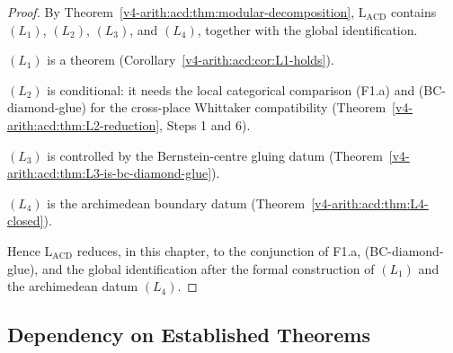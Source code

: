 \begin{proof}
By Theorem~\ref{v4-arith:acd:thm:modular-decomposition},
\(\mathrm{L}_{\mathrm{ACD}}\) contains
\((L_{1})\), \((L_{2})\), \((L_{3})\), and \((L_{4})\), together with
the global identification.

\((L_{1})\) is a theorem (Corollary~\ref{v4-arith:acd:cor:L1-holds}).

\((L_{2})\) is conditional: it needs the local categorical
comparison (F1.a) and (BC-diamond-glue) for the cross-place
Whittaker compatibility
(Theorem~\ref{v4-arith:acd:thm:L2-reduction}, Steps 1 and 6).

\((L_{3})\) is controlled by the Bernstein-centre gluing datum
(Theorem~\ref{v4-arith:acd:thm:L3-is-bc-diamond-glue}).

\((L_{4})\) is the archimedean boundary datum
(Theorem~\ref{v4-arith:acd:thm:L4-closed}).

Hence \(\mathrm{L}_{\mathrm{ACD}}\) reduces, in this chapter, to the
conjunction of F1.a, (BC-diamond-glue), and the global identification
after the formal construction of \((L_{1})\) and the archimedean datum
\((L_{4})\).
\end{proof}

\subsection{Dependency on Established Theorems}

